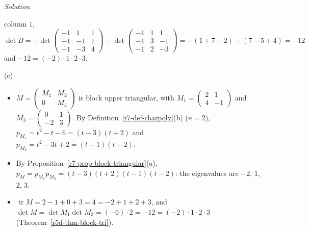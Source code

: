 \documentclass[12pt]{article}
\DeclareMathOperator{\tr}{tr}
\theoremstyle{definition}
\newenvironment{solution}{\par\noindent\textit{Solution.}\ }{\par\smallskip}
\begin{document}
\begin{solution}
\begin{itemize}
column \(1\),
\[
\det B=-\det\begin{pmatrix}-1&1&1\\-1&-1&1\\-1&-3&4\end{pmatrix}-\det\begin{pmatrix}-1&1&1\\-1&3&-1\\-1&2&-3\end{pmatrix}
=-(1+7-2)-(7-5+4)=-12
\]
and \(-12=(-2)\cdot1\cdot2\cdot3\).
\end{itemize}
(c)
\begin{itemize}
\item \(M=\left(\begin{smallmatrix}M_1&M_2\\0&M_3\end{smallmatrix}\right)\) is block upper triangular, with
\(M_1=\left(\begin{smallmatrix}2&1\\4&-1\end{smallmatrix}\right)\) and \(M_3=\left(\begin{smallmatrix}0&1\\-2&3\end{smallmatrix}\right)\).
By Definition~\ref{r7-def-charpoly}(b) (\(n=2\)), \(p_{M_1}=t^2-t-6=(t-3)(t+2)\) and \(p_{M_3}=t^2-3t+2=(t-1)(t-2)\).
\item By Proposition~\ref{r7-prop-block-triangular}(a), \(p_M=p_{M_1}p_{M_3}=(t-3)(t+2)(t-1)(t-2)\): the eigenvalues are
\(-2\), \(1\), \(2\), \(3\).
\item \(\tr M=2-1+0+3=4=-2+1+2+3\), and \(\det M=\det M_1\det M_3=(-6)\cdot2=-12=(-2)\cdot1\cdot2\cdot3\)
(Theorem~\ref{r5d-thm-block-tri}).
\end{itemize}
\end{solution}
\end{document}
